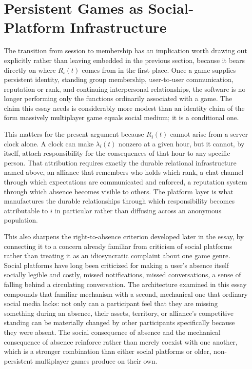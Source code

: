 \documentclass[11pt]{article}
\begin{document}
\section{Persistent Games as Social-Platform Infrastructure}

The transition from session to membership has an implication worth drawing out explicitly rather than leaving embedded in the previous section, because it bears directly on where $R_i(t)$ comes from in the first place. Once a game supplies persistent identity, standing group membership, user-to-user communication, reputation or rank, and continuing interpersonal relationships, the software is no longer performing only the functions ordinarily associated with a game. The claim this essay needs is considerably more modest than an identity claim of the form massively multiplayer game equals social medium; it is a conditional one.
\begin{center}
\end{center}
This matters for the present argument because $R_i(t)$ cannot arise from a server clock alone. A clock can make $\lambda_i(t)$ nonzero at a given hour, but it cannot, by itself, attach responsibility for the consequences of that hour to any specific person. That attribution requires exactly the durable relational infrastructure named above, an alliance that remembers who holds which rank, a chat channel through which expectations are communicated and enforced, a reputation system through which absence becomes visible to others. The platform layer is what manufactures the durable relationships through which responsibility becomes attributable to $i$ in particular rather than diffusing across an anonymous population.

This also sharpens the right-to-absence criterion developed later in the essay, by connecting it to a concern already familiar from criticism of social platforms rather than treating it as an idiosyncratic complaint about one game genre. Social platforms have long been criticized for making a user's absence itself socially legible and costly, missed notifications, missed conversations, a sense of falling behind a circulating conversation. The architecture examined in this essay compounds that familiar mechanism with a second, mechanical one that ordinary social media lacks: not only can a participant feel that they are missing something during an absence, their assets, territory, or alliance's competitive standing can be materially changed by other participants specifically because they were absent. The social consequence of absence and the mechanical consequence of absence reinforce rather than merely coexist with one another, which is a stronger combination than either social platforms or older, non-persistent multiplayer games produce on their own.
\end{document}
